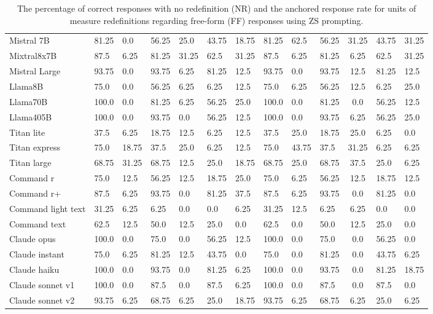 \begin{table*}[h!]
\begin{tabular}{l|p{0.7cm}p{0.6cm}|p{0.7cm}p{0.6cm}|p{0.7cm}p{0.6cm}|p{0.7cm}p{0.6cm}|p{0.7cm}c|p{0.7cm}p{0.6cm}}
Mistral 7B & 81.25 & 0.0 & 56.25 & 25.0 & 43.75 & 18.75 & 81.25 & 62.5 & 56.25 & 31.25 & 43.75 & 31.25 \\ 
Mixtral8x7B & 87.5 & 6.25 & 81.25 & 31.25 & 62.5 & 31.25 & 87.5 & 6.25 & 81.25 & 6.25 & 62.5 & 31.25 \\ 
Mistral Large & 93.75 & 0.0 & 93.75 & 6.25 & 81.25 & 12.5 & 93.75 & 0.0 & 93.75 & 12.5 & 81.25 & 12.5 \\ \hline
Llama8B & 75.0 & 0.0 & 56.25 & 6.25 & 6.25 & 12.5 & 75.0 & 6.25 & 56.25 & 12.5 & 6.25 & 25.0 \\ 
Llama70B & 100.0 & 0.0 & 81.25 & 6.25 & 56.25 & 25.0 & 100.0 & 0.0 & 81.25 & 0.0 & 56.25 & 12.5 \\ 
Llama405B & 100.0 & 0.0 & 93.75 & 0.0 & 56.25 & 12.5 & 100.0 & 0.0 & 93.75 & 6.25 & 56.25 & 25.0 \\ \hline
Titan lite & 37.5 & 6.25 & 18.75 & 12.5 & 6.25 & 12.5 & 37.5 & 25.0 & 18.75 & 25.0 & 6.25 & 0.0 \\
Titan express & 75.0 & 18.75 & 37.5 & 25.0 & 6.25 & 12.5 & 75.0 & 43.75 & 37.5 & 31.25 & 6.25 & 6.25 \\
Titan large & 68.75 & 31.25 & 68.75 & 12.5 & 25.0 & 18.75 & 68.75 & 25.0 & 68.75 & 37.5 & 25.0 & 6.25 \\ \hline
Command r & 75.0 & 12.5 & 56.25 & 12.5 & 18.75 & 25.0 & 75.0 & 6.25 & 56.25 & 12.5 & 18.75 & 12.5 \\ 
Command r+ & 87.5 & 6.25 & 93.75 & 0.0 & 81.25 & 37.5 & 87.5 & 6.25 & 93.75 & 0.0 & 81.25 & 0.0 \\ 
Command light text & 31.25 & 6.25 & 6.25 & 0.0 & 0.0 & 6.25 & 31.25 & 12.5 & 6.25 & 6.25 & 0.0 & 0.0 \\ 
Command text & 62.5 & 12.5 & 50.0 & 12.5 & 25.0 & 0.0 & 62.5 & 0.0 & 50.0 & 12.5 & 25.0 & 0.0 \\ \hline
Claude opus & 100.0 & 0.0 & 75.0 & 0.0 & 56.25 & 12.5 & 100.0 & 0.0 & 75.0 & 0.0 & 56.25 & 0.0 \\
Claude instant & 75.0 & 6.25 & 81.25 & 12.5 & 43.75 & 0.0 & 75.0 & 0.0 & 81.25 & 0.0 & 43.75 & 6.25 \\ 
Claude haiku & 100.0 & 0.0 & 93.75 & 0.0 & 81.25 & 6.25 & 100.0 & 0.0 & 93.75 & 0.0 & 81.25 & 18.75 \\ 
Claude sonnet v1 & 100.0 & 0.0 & 87.5 & 0.0 & 87.5 & 6.25 & 100.0 & 0.0 & 87.5 & 0.0 & 87.5 & 0.0 \\ 
Claude sonnet v2 & 93.75 & 6.25 & 68.75 & 6.25 & 25.0 & 18.75 & 93.75 & 6.25 & 68.75 & 6.25 & 25.0 & 6.25 \\ 
\hline
\end{tabular}

\caption{The percentage of correct responses with no redefinition (NR) and the anchored response rate for units of measure redefinitions regarding free-form (FF) responses using ZS prompting.}
\label{tab:anchored_table_NR_units}
\end{table*}


